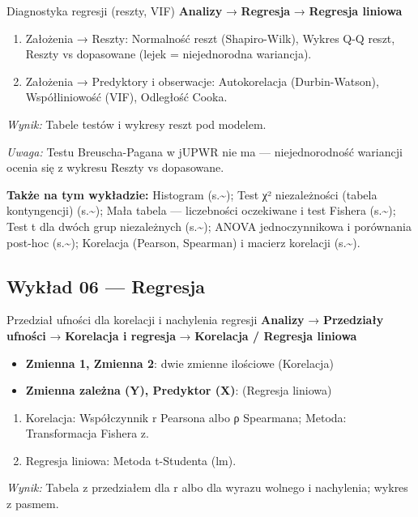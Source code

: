 \documentclass[
  polish,
  10pt,
  a4paper,
  DIV=11,
  numbers=noendperiod]{scrartcl}
\newcommand{\jmenu}[1]{{\color{upwraccent}\small #1}}
\begin{document}
\begin{jbox}{Diagnostyka regresji (reszty, VIF)}\label{w:jakosc-modelu}
\jmenu{\textbf{Analizy} → \textbf{Regresja} → \textbf{Regresja liniowa}}

\begin{enumerate}
\item Założenia → Reszty: Normalność reszt (Shapiro-Wilk), Wykres Q-Q reszt, Reszty vs dopasowane (lejek = niejednorodna wariancja).
\item Założenia → Predyktory i obserwacje: Autokorelacja (Durbin-Watson), Współliniowość (VIF), Odległość Cooka.
\end{enumerate}
\textit{Wynik:} Tabele testów i wykresy reszt pod modelem.

{\color{upwrsoft}\small\textit{Uwaga:} Testu Breuscha-Pagana w jUPWR nie ma — niejednorodność wariancji ocenia się z wykresu Reszty vs dopasowane.}
\end{jbox}

\textbf{Także na tym wykładzie:} Histogram
(s.\textasciitilde{}\pageref{w:histogram}); Test χ² niezależności
(tabela kontyngencji)
(s.\textasciitilde{}\pageref{w:chi2-niezaleznosc}); Mała tabela ---
liczebności oczekiwane i test Fishera
(s.\textasciitilde{}\pageref{w:fisher}); Test t dla dwóch grup
niezależnych (s.\textasciitilde{}\pageref{w:t-dwie-grupy}); ANOVA
jednoczynnikowa i porównania post-hoc
(s.\textasciitilde{}\pageref{w:anova}); Korelacja (Pearson, Spearman) i
macierz korelacji (s.\textasciitilde{}\pageref{w:korelacja}).


\subsection{Wykład 06 --- Regresja}\label{wykux142ad-06-regresja}

\begin{jbox}{Przedział ufności dla korelacji i nachylenia regresji}\label{w:ci-korelacja-regresja}
\jmenu{\textbf{Analizy} → \textbf{Przedziały ufności} → \textbf{Korelacja i regresja} → \textbf{Korelacja / Regresja liniowa}}

\begin{itemize}
\item[$\triangleright$] \textbf{Zmienna 1, Zmienna 2}: dwie zmienne ilościowe (Korelacja)
\item[$\triangleright$] \textbf{Zmienna zależna (Y), Predyktor (X)}: (Regresja liniowa)
\end{itemize}
\begin{enumerate}
\item Korelacja: Współczynnik r Pearsona albo ρ Spearmana; Metoda: Transformacja Fishera z.
\item Regresja liniowa: Metoda t-Studenta (lm).
\end{enumerate}
\textit{Wynik:} Tabela z przedziałem dla r albo dla wyrazu wolnego i nachylenia; wykres z pasmem.

\end{jbox}
\end{document}
